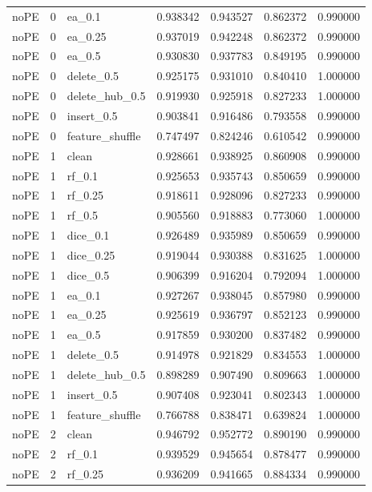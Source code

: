 \documentclass[UTF8,a4paper,11pt,fontset=fandol]{ctexart}
\begin{document}
{\begin{longtable}{lrlrrrr}
noPE & 0 & ea\_0.1 & 0.938342 & 0.943527 & 0.862372 & 0.990000 \\
noPE & 0 & ea\_0.25 & 0.937019 & 0.942248 & 0.862372 & 0.990000 \\
noPE & 0 & ea\_0.5 & 0.930830 & 0.937783 & 0.849195 & 0.990000 \\
noPE & 0 & delete\_0.5 & 0.925175 & 0.931010 & 0.840410 & 1.000000 \\
noPE & 0 & delete\_hub\_0.5 & 0.919930 & 0.925918 & 0.827233 & 1.000000 \\
noPE & 0 & insert\_0.5 & 0.903841 & 0.916486 & 0.793558 & 0.990000 \\
noPE & 0 & feature\_shuffle & 0.747497 & 0.824246 & 0.610542 & 0.990000 \\
noPE & 1 & clean & 0.928661 & 0.938925 & 0.860908 & 0.990000 \\
noPE & 1 & rf\_0.1 & 0.925653 & 0.935743 & 0.850659 & 0.990000 \\
noPE & 1 & rf\_0.25 & 0.918611 & 0.928096 & 0.827233 & 0.990000 \\
noPE & 1 & rf\_0.5 & 0.905560 & 0.918883 & 0.773060 & 1.000000 \\
noPE & 1 & dice\_0.1 & 0.926489 & 0.935989 & 0.850659 & 0.990000 \\
noPE & 1 & dice\_0.25 & 0.919044 & 0.930388 & 0.831625 & 1.000000 \\
noPE & 1 & dice\_0.5 & 0.906399 & 0.916204 & 0.792094 & 1.000000 \\
noPE & 1 & ea\_0.1 & 0.927267 & 0.938045 & 0.857980 & 0.990000 \\
noPE & 1 & ea\_0.25 & 0.925619 & 0.936797 & 0.852123 & 0.990000 \\
noPE & 1 & ea\_0.5 & 0.917859 & 0.930200 & 0.837482 & 0.990000 \\
noPE & 1 & delete\_0.5 & 0.914978 & 0.921829 & 0.834553 & 1.000000 \\
noPE & 1 & delete\_hub\_0.5 & 0.898289 & 0.907490 & 0.809663 & 1.000000 \\
noPE & 1 & insert\_0.5 & 0.907408 & 0.923041 & 0.802343 & 1.000000 \\
noPE & 1 & feature\_shuffle & 0.766788 & 0.838471 & 0.639824 & 1.000000 \\
noPE & 2 & clean & 0.946792 & 0.952772 & 0.890190 & 0.990000 \\
noPE & 2 & rf\_0.1 & 0.939529 & 0.945654 & 0.878477 & 0.990000 \\
noPE & 2 & rf\_0.25 & 0.936209 & 0.941665 & 0.884334 & 0.990000 \\

\end{longtable}}
\end{document}
